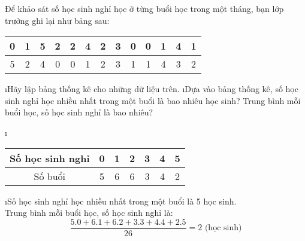 \begin{bt}
	Để khảo sát số học sinh nghỉ học ở từng buổi học trong một tháng, bạn lớp trưởng ghi lại như bảng sau:
	\begin{center}
		\begin{tabular}{|c|c|c|c|c|c|c|c|c|c|c|c|c|}
			\hline
			0&	1&	5&	2&	2&	4&	2&	3&	0	&0&	1&	4&	1\\
			\hline
			5&	2&	4&	0&	0&	1&	2&	3&	1	&1&	4&	3&	2\\
			\hline
		\end{tabular}
	\end{center}
	\begin{enumerate}[a),leftmargin=*]
		\i Hãy lập bảng thống kê cho những dữ liệu trên.
		\i Dựa vào bảng thống kê, số học sinh nghỉ học nhiều nhất trong một buổi là bao nhiêu học sinh? Trung bình mỗi buổi học, số học sinh nghỉ là bao nhiêu?
	\end{enumerate}
	\begin{loigiaichuong39}
		\begin{enumerate}[a),leftmargin=*]
			\i \begin{tabular}{|c|c|c|c|c|c|c|}
				\hline
				Số học sinh nghỉ&	0&	1	&2&	3&	4&	5\\
				\hline
				Số buổi&	5&	6&	6&	3&	4&	2\\
				\hline
			\end{tabular}
			\i Số học sinh nghỉ học nhiều nhất trong một buổi là 5 học sinh.\\ 
			Trung bình mỗi buổi học, số học sinh nghỉ là:
			\[\dfrac{{5.0 + 6.1 + 6.2 + 3.3 + 4.4 + 2.5}}{{26}} = 2 \text{ (học sinh)}\]
		\end{enumerate}
	\end{loigiaichuong39}
\end{bt}
